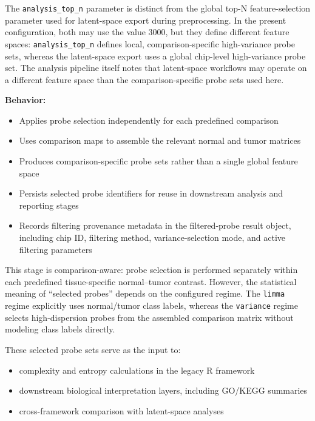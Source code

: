 \documentclass[
  letterpaper,
  DIV=11,
  numbers=noendperiod,
  openany,
  oneside]{scrreprt}
\providecommand{\tightlist}{%
  \setlength{\itemsep}{0pt}\setlength{\parskip}{0pt}}
\begin{document}
The \texttt{analysis\_top\_n} parameter is distinct from the global
top-N feature-selection parameter used for latent-space export during
preprocessing. In the present configuration, both may use the value
3000, but they define different feature spaces:
\texttt{analysis\_top\_n} defines local, comparison-specific
high-variance probe sets, whereas the latent-space export uses a global
chip-level high-variance probe set. The analysis pipeline itself notes
that latent-space workflows may operate on a different feature space
than the comparison-specific probe sets used here.

\textbf{Behavior:}

\begin{itemize}
\tightlist
\item
  Applies probe selection independently for each predefined comparison
\item
  Uses comparison maps to assemble the relevant normal and tumor
  matrices
\item
  Produces comparison-specific probe sets rather than a single global
  feature space
\item
  Persists selected probe identifiers for reuse in downstream analysis
  and reporting stages
\item
  Records filtering provenance metadata in the filtered-probe result
  object, including chip ID, filtering method, variance-selection mode,
  and active filtering parameters
\end{itemize}

This stage is comparison-aware: probe selection is performed separately
within each predefined tissue-specific normal--tumor contrast. However,
the statistical meaning of ``selected probes'' depends on the configured
regime. The \texttt{limma} regime explicitly uses normal/tumor class
labels, whereas the \texttt{variance} regime selects high-dispersion
probes from the assembled comparison matrix without modeling class
labels directly.

These selected probe sets serve as the input to:

\begin{itemize}
\tightlist
\item
  complexity and entropy calculations in the legacy R framework
\item
  downstream biological interpretation layers, including GO/KEGG
  summaries
\item
  cross-framework comparison with latent-space analyses
\end{itemize}
\end{document}
